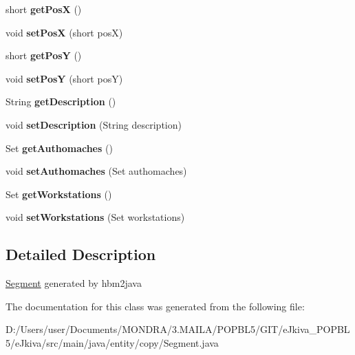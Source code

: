 \begin{DoxyCompactItemize}
short {\bfseries get\+PosX} ()
\item 
\mbox{\label{classentity_1_1copy_1_1_segment_a484a875d3998b86c9e2785dda92c80be}} 
void {\bfseries set\+PosX} (short posX)
\item 
\mbox{\label{classentity_1_1copy_1_1_segment_afeff5d69389c11594aea4c8022b091aa}} 
short {\bfseries get\+PosY} ()
\item 
\mbox{\label{classentity_1_1copy_1_1_segment_a723be68a00fd5ba6b611ae1a422623db}} 
void {\bfseries set\+PosY} (short posY)
\item 
\mbox{\label{classentity_1_1copy_1_1_segment_a26ecce65812240eaa2e16ec682232d5d}} 
String {\bfseries get\+Description} ()
\item 
\mbox{\label{classentity_1_1copy_1_1_segment_aff9d53672caa0322d2945ac5fdab98a2}} 
void {\bfseries set\+Description} (String description)
\item 
\mbox{\label{classentity_1_1copy_1_1_segment_a5189c116972e6edf25b93f7cf6a2f240}} 
Set {\bfseries get\+Authomaches} ()
\item 
\mbox{\label{classentity_1_1copy_1_1_segment_a59821795a004c811bc9a0bad93029e77}} 
void {\bfseries set\+Authomaches} (Set authomaches)
\item 
\mbox{\label{classentity_1_1copy_1_1_segment_a1e675911e1de49403b8bc85d038f83e2}} 
Set {\bfseries get\+Workstations} ()
\item 
\mbox{\label{classentity_1_1copy_1_1_segment_a6b602ce6bc1afa4998eaf2f192a43f58}} 
void {\bfseries set\+Workstations} (Set workstations)
\end{DoxyCompactItemize}


\subsection{Detailed Description}
\mbox{\hyperlink{classentity_1_1copy_1_1_segment}{Segment}} generated by hbm2java 

The documentation for this class was generated from the following file\+:\begin{DoxyCompactItemize}
\item 
D\+:/\+Users/user/\+Documents/\+M\+O\+N\+D\+R\+A/3.\+M\+A\+I\+L\+A/\+P\+O\+P\+B\+L5/\+G\+I\+T/e\+Jkiva\+\_\+\+P\+O\+P\+B\+L5/e\+Jkiva/src/main/java/entity/copy/Segment.\+java\end{DoxyCompactItemize}
